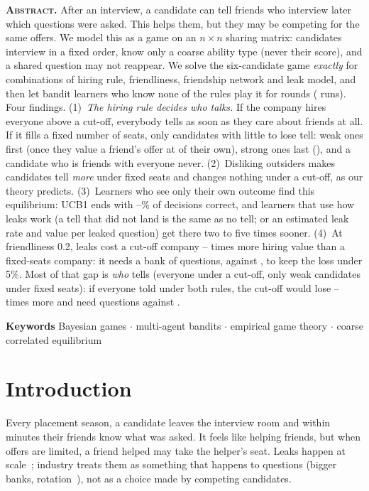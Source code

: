 \documentclass[10pt]{article}
\theoremstyle{plain}
\theoremstyle{definition}\newtheorem{definition}{Definition}
\begin{document}
\begin{center}\begin{minipage}{0.94\textwidth}\small
\textbf{\scshape Abstract.}
After an interview, a candidate can tell friends who interview later which questions were asked. This helps them, but they may be
competing for the same offers. We model this as a game on an $n\times n$ sharing matrix: candidates interview in a fixed order, know
only a coarse ability type (never their score), and a shared question may not reappear.
We solve the six-candidate game \emph{exactly} for \XoneCells{} combinations of hiring rule, friendliness, friendship network and leak
model, and then let bandit learners who know none of the rules play it for \XthreeT{} rounds (\XthreeRuns{} runs).
Four findings.
(1)~\emph{The hiring rule decides who talks.} If the company hires everyone above a cut-off, everybody tells as soon as they care about
friends at all. If it fills a fixed number of seats, only candidates with little to lose tell: weak ones first (once they value a
friend's offer at \AstarLocalSeatsWeak{} of their own), strong ones last (\AstarLocalSeatsStrong), and a candidate who is friends with
everyone never.
(2)~Disliking outsiders makes candidates tell \emph{more} under fixed seats and changes nothing under a cut-off, as our theory predicts.
(3)~Learners who see only their own outcome find this equilibrium: UCB1 ends with \AgreeUcbEoneSeats--\AgreeUcbEoneBar\% of decisions
correct, and learners that use how leaks work (a tell that did not land is the same as no tell; or an estimated leak rate and value per leaked question) get there two to five times sooner.
(4)~At friendliness 0.2, leaks cost a cut-off company \LamRatioMin--\LamRatioMax{} times more hiring value than a fixed-seats company: it needs a
bank of \QFiveBar{} questions, against \QFiveSeats, to keep the loss under 5\%. Most of that gap is \emph{who} tells (everyone under a cut-off, only weak
candidates under fixed seats): if everyone told under both rules, the cut-off would lose \LamAllRatioMin--\LamAllRatioMax{} times more and need \QFiveAllBar{}
questions against \QFiveAllSeats.

\textbf{Keywords}\; Bayesian games $\cdot$ multi-agent bandits $\cdot$ empirical game theory $\cdot$ coarse correlated equilibrium
\end{minipage}\end{center}

\section{Introduction}
Every placement season, a candidate leaves the interview room and within minutes their friends know what was asked. It feels like
helping friends, but when offers are limited, a friend helped may take the helper's seat. Leaks happen at scale~\cite{blind,glider};
industry treats them as something that happens to questions (bigger banks, rotation~\cite{glider}), not as a choice made by competing candidates.
\end{document}
